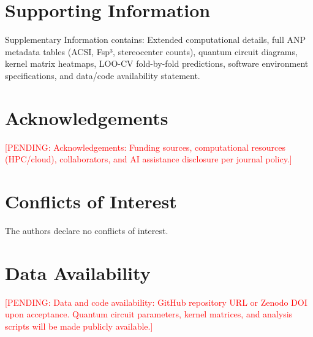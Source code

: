 \documentclass[11pt,a4paper]{article}
\newcommand{\PENDING}[1]{\textcolor{red}{[PENDING: #1]}}
\begin{document}

\section*{Supporting Information}

Supplementary Information contains: Extended computational details, full ANP metadata tables (ACSI, Fsp³, stereocenter counts), quantum circuit diagrams, kernel matrix heatmaps, LOO-CV fold-by-fold predictions, software environment specifications, and data/code availability statement.


\section*{Acknowledgements}

\PENDING{Acknowledgements: Funding sources, computational resources (HPC/cloud), collaborators, and AI assistance disclosure per journal policy.}


\section*{Conflicts of Interest}

The authors declare no conflicts of interest.


\section*{Data Availability}

\PENDING{Data and code availability: GitHub repository URL or Zenodo DOI upon acceptance. Quantum circuit parameters, kernel matrices, and analysis scripts will be made publicly available.}




\end{document}
